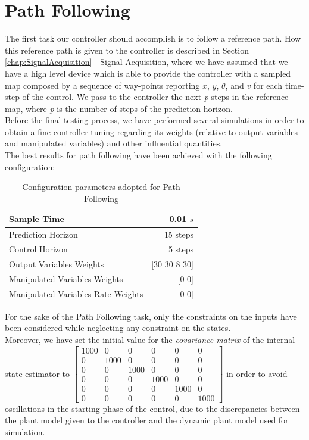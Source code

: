 \section{Path Following}
\label{chap:path_following}
The first task our controller should accomplish is to follow a reference path.
How this reference path is given to the controller is described in Section \ref{chap:SignalAcquisition} - Signal Acquisition, where we have assumed that we have a high level device which is able to provide the controller with a sampled map composed by a sequence of way-points reporting $x$, $y$, $\theta$, and $v$ for each time-step of the control. We pass to the controller the next \textit{p} steps in the reference map, where \textit{p} is the number of steps of the prediction horizon.\\
Before the final testing process, we have performed several simulations in order to obtain a fine controller tuning regarding its weights (relative to output variables and manipulated variables) and other influential quantities. \\
The best results for path following have been achieved with the following configuration:
\begin{table}[H]
\centering
\begin{tabular}{|l|r|}\hline
Sample Time                        & 0.01 $s$           \\ \hline
Prediction Horizon                 & 15 steps         \\ \hline
Control Horizon                    & 5 steps          \\ \hline
Output Variables Weights           & {[}30 30 8 30{]} \\ \hline
Manipulated Variables Weights      & {[}0 0{]}        \\ \hline
Manipulated Variables Rate Weights & {[}0 0{]}       \\ \hline
\end{tabular}
\caption{Configuration parameters adopted for Path Following}
\label{tab:configuration}
\end{table}
For the sake of the Path Following task, only the constraints on the inputs have been considered while neglecting any constraint on the states.\\
Moreover, we have set the initial value for the \textit{covariance matrix} of the internal state estimator to $\left[ \begin{smallmatrix} 1000 & 0 & 0 & 0 & 0 & 0 \\0 & 1000 & 0 & 0 & 0 & 0 \\0 & 0 & 1000 & 0 & 0 & 0 \\ 0 & 0 & 0 & 1000 & 0 & 0 \\ 0 & 0 & 0 & 0 & 1000 & 0 \\ 0 & 0 & 0 & 0 & 0 & 1000 \end{smallmatrix} \right] $ in order to avoid oscillations in the starting phase of the control, due to the discrepancies between the plant model given to the controller and the dynamic plant model used for simulation.
